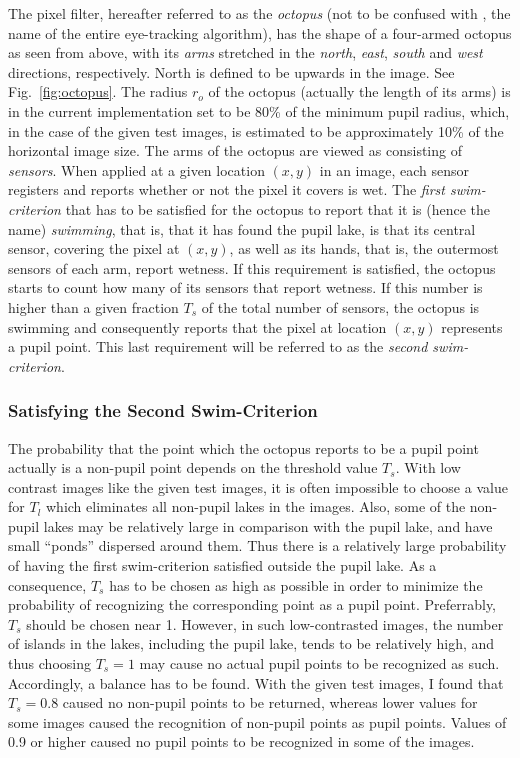 The pixel filter, hereafter referred to as the {\em octopus\/} (not to
be confused with {\octopus}, the name of the entire eye-tracking
algorithm), has the shape of a four-armed octopus as seen from above,
with its {\em arms\/} stretched in the {\em north\/}, {\em east\/},
{\em south\/} and {\em west\/} directions, respectively.  North is
defined to be upwards in the image.  See Fig.~\ref{fig:octopus}.  The
radius $r_{o}$ of the octopus (actually the length of its arms) is in
the current implementation set to be 80\% of the minimum pupil radius,
which, in the case of the given test images, is estimated to be
approximately 10\% of the horizontal image size.  The arms of the
octopus are viewed as consisting of {\em sensors\/}.  When applied at
a given location $(x,y)$ in an image, each sensor registers and
reports whether or not the pixel it covers is wet.  The {\em first
  swim-criterion\/} that has to be satisfied for the octopus to report
that it is (hence the name) {\em swimming\/}, that is, that it has
found the pupil lake, is that its central sensor, covering the pixel
at $(x,y)$, as well as its hands, that is, the outermost sensors of
each arm, report wetness.  If this requirement is satisfied, the
octopus starts to count how many of its sensors that report wetness.
If this number is higher than a given fraction $T_{s}$ of the total
number of sensors, the octopus is swimming and consequently reports
that the pixel at location $(x,y)$ represents a pupil point.  This
last requirement will be referred to as the {\em second
  swim-criterion\/}.


\subsubsection{Satisfying the Second Swim-Criterion}

The probability that the point which the octopus reports to be a pupil
point actually is a non-pupil point depends on the threshold value
$T_{s}$.  With low contrast images like the given test images, it is
often impossible to choose a value for $T_{l}$ which eliminates all
non-pupil lakes in the images.  Also, some of the non-pupil lakes may
be relatively large in comparison with the pupil lake, and have small
``ponds'' dispersed around them.  Thus there is a relatively large
probability of having the first swim-criterion satisfied outside the
pupil lake.  As a consequence, $T_{s}$ has to be chosen as high as
possible in order to minimize the probability of recognizing the
corresponding point as a pupil point.  Preferrably, $T_{s}$ should be
chosen near 1.  However, in such low-contrasted images, the number of
islands in the lakes, including the pupil lake, tends to be relatively
high, and thus choosing $T_{s}=1$ may cause no actual pupil points to
be recognized as such.  Accordingly, a balance has to be found.  With
the given test images, I found that $T_{s}=0.8$ caused no non-pupil
points to be returned, whereas lower values for some images caused the
recognition of non-pupil points as pupil points.  Values of 0.9 or
higher caused no pupil points to be recognized in some of the images.

